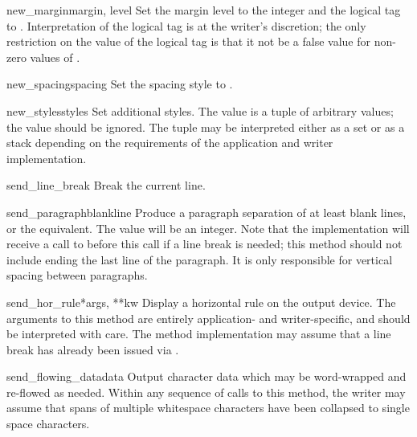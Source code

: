 \begin{methoddesc}[writer]{new_margin}{margin, level}
Set the margin level to the integer  and the logical tag
to .  Interpretation of the logical tag is at the
writer's discretion; the only restriction on the value of the logical
tag is that it not be a false value for non-zero values of
.
\end{methoddesc}

\begin{methoddesc}[writer]{new_spacing}{spacing}
Set the spacing style to .
\end{methoddesc}

\begin{methoddesc}[writer]{new_styles}{styles}
Set additional styles.  The  value is a tuple of
arbitrary values; the value  should be ignored.  The
 tuple may be interpreted either as a set or as a stack
depending on the requirements of the application and writer
implementation.
\end{methoddesc}

\begin{methoddesc}[writer]{send_line_break}{}
Break the current line.
\end{methoddesc}

\begin{methoddesc}[writer]{send_paragraph}{blankline}
Produce a paragraph separation of at least  blank
lines, or the equivalent.  The  value will be an
integer.  Note that the implementation will receive a call to
 before this call if a line break is needed; 
this method should not include ending the last line of the paragraph.
It is only responsible for vertical spacing between paragraphs.
\end{methoddesc}

\begin{methoddesc}[writer]{send_hor_rule}{*args, **kw}
Display a horizontal rule on the output device.  The arguments to this
method are entirely application- and writer-specific, and should be
interpreted with care.  The method implementation may assume that a
line break has already been issued via .
\end{methoddesc}

\begin{methoddesc}[writer]{send_flowing_data}{data}
Output character data which may be word-wrapped and re-flowed as
needed.  Within any sequence of calls to this method, the writer may
assume that spans of multiple whitespace characters have been
collapsed to single space characters.
\end{methoddesc}

